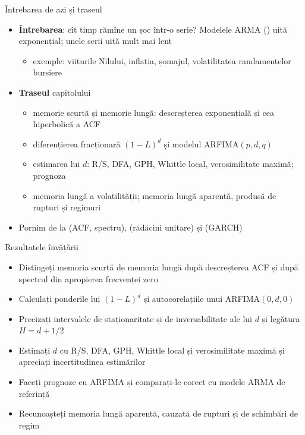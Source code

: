 \begin{frame}{Întrebarea de azi și traseul}
\itemsize{\small}
\begin{itemize}
    \item \textbf{Întrebarea}: cît timp rămîne un șoc într-o serie? Modelele ARMA () uită exponențial; unele serii uită mult mai lent
    \begin{itemize}
        \item exemple: viiturile Nilului, inflația, șomajul, volatilitatea randamentelor bursiere
    \end{itemize}
    \item \textbf{Traseul} capitolului
    \begin{itemize}
        \item memorie scurtă și memorie lungă: descreșterea exponențială și cea hiperbolică a ACF
        \item diferențierea fracționară $(1-L)^d$ și modelul ARFIMA$(p,d,q)$
        \item estimarea lui $d$: R/S, DFA, GPH, Whittle local, verosimilitate maximă; prognoza
        \item memoria lungă a volatilității; memoria lungă aparentă, produsă de rupturi și regimuri
    \end{itemize}
    \item Pornim de la  (ACF, spectru),  (rădăcini unitare) și  (GARCH)
\end{itemize}
\end{frame}

\begin{frame}{Rezultatele învățării}
\itemsize{\small}
\begin{itemize}
    \item Distingeți memoria scurtă de memoria lungă după descreșterea ACF și după spectrul din apropierea frecvenței zero
    \item Calculați ponderile lui $(1-L)^d$ și autocorelațiile unui ARFIMA$(0,d,0)$
    \item Precizați intervalele de staționaritate și de inversabilitate ale lui $d$ și legătura $H = d + 1/2$
    \item Estimați $d$ cu R/S, DFA, GPH, Whittle local și verosimilitate maximă și apreciați incertitudinea estimărilor
    \item Faceți prognoze cu ARFIMA și comparați-le corect cu modele ARMA de referință
    \item Recunoașteți memoria lungă aparentă, cauzată de rupturi și de schimbări de regim
\end{itemize}
\end{frame}

